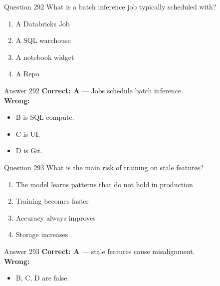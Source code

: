 \documentclass[aspectratio=169,11pt]{beamer}
\begin{document}
	\begin{frame}{Question 292}
		What is a batch inference job typically scheduled with?
		\begin{enumerate}[label=\Alph*.]
			\item A Databricks Job
			\item A SQL warehouse
			\item A notebook widget
			\item A Repo
		\end{enumerate}
	\end{frame}
	\begin{frame}{Answer 292}
		\textbf{Correct: A} --- Jobs schedule batch inference.\\
		\vspace{0.5em}
		\textbf{Wrong:}
		\begin{itemize}
			\item B is SQL compute.
			\item C is UI.
			\item D is Git.
		\end{itemize}
	\end{frame}
	
	\begin{frame}{Question 293}
		What is the main risk of training on stale features?
		\begin{enumerate}[label=\Alph*.]
			\item The model learns patterns that do not hold in production
			\item Training becomes faster
			\item Accuracy always improves
			\item Storage increases
		\end{enumerate}
	\end{frame}
	\begin{frame}{Answer 293}
		\textbf{Correct: A} --- stale features cause misalignment.\\
		\vspace{0.5em}
		\textbf{Wrong:}
		\begin{itemize}
			\item B, C, D are false.
		\end{itemize}
	\end{frame}
	
\end{document}

